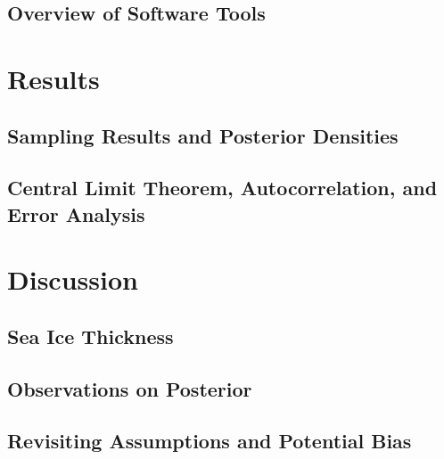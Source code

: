 \documentclass[12pt, letterpaper]{article}
\begin{document}
\subsection{Overview of Software Tools}

\section{Results}

\subsection{Sampling Results and Posterior Densities}

\subsection{Central Limit Theorem, Autocorrelation, and Error Analysis}

\section{Discussion}

\subsection{Sea Ice Thickness}

\subsection{Observations on Posterior}

\subsection{Revisiting Assumptions and Potential Bias}
\end{document}
